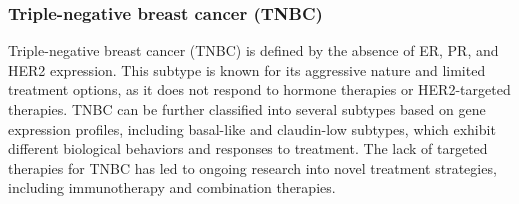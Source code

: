 \subsubsection{Triple-negative breast cancer (TNBC)}
Triple-negative breast cancer (TNBC) is defined by the absence of ER, PR, and
HER2 expression.
This subtype is known for its aggressive nature and limited treatment options,
as it does not respond to hormone therapies or HER2-targeted
therapies\supercite{sizemore_triple_2021}.
TNBC can be further classified into several subtypes based on gene expression
profiles, including basal-like and claudin-low subtypes, which exhibit
different biological behaviors and responses to
treatment\supercite{lehmann_identification_2011}.
The lack of targeted therapies for TNBC has led to ongoing research into novel
treatment strategies, including immunotherapy and combination
therapies\supercite{lehmann_identification_2011}.

